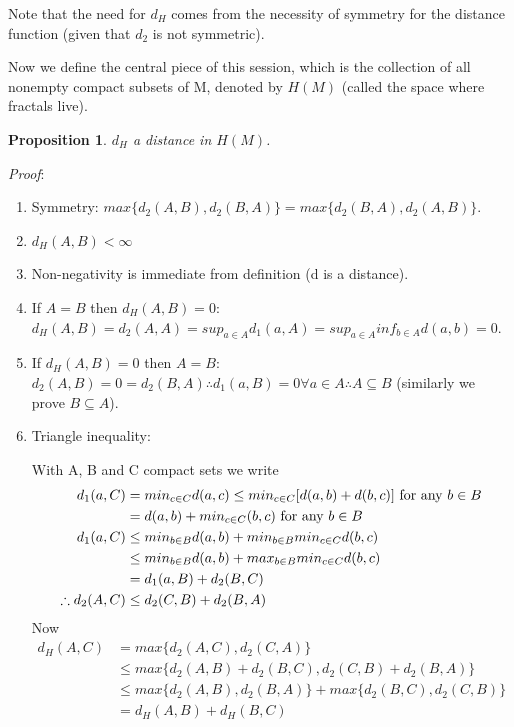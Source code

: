 \documentclass[a4paper]{article}
\theoremstyle{plain}
\newtheorem{prop} [theorem]{Proposition}
\theoremstyle{definition}
\begin{document}
Note that the need for $d_H$ comes from the necessity of symmetry for the distance function (given that $d_2$ is not symmetric).

Now we define the central piece of this session, which is the collection of all nonempty compact subsets of M, denoted by $H(M)$ (called the space where fractals live).

\begin{prop}
$d_H$ a distance in $H(M)$.
\end{prop}
\textit{Proof}: 
\begin{enumerate}
    \item Symmetry: $max\{d_2(A,B),d_2(B,A)\} = max\{d_2(B,A),d_2(A,B)\}$.
    \item $d_H(A,B) < \infty$
    \item Non-negativity is immediate from definition (d is a distance).
    \item If $A=B$ then $d_H(A,B) = 0$: $d_H(A,B) = d_2(A,A) = sup_{a \in A} d_1(a,A) = sup_{a \in A} inf_{b \in A} d(a,b) = 0$.
    \item If $d_H(A,B) = 0$ then $A=B$: $d_2(A,B) = 0 = d_2(B,A) \therefore d_1(a,B) = 0 \forall a \in A \therefore A \subseteq B$ (similarly we prove $B \subseteq A$).
    \item Triangle inequality:
    
    With A, B and C compact sets we write
    \begin{align*}
        d_1(a, C) &= min_{c \in C} d(a,c) \leq min_{c \in C}[d(a,b) + d(b,c)] \textnormal{ for any } b \in B\\
        &= d(a,b) + min_{c \in C}(b,c) \textnormal{ for any } b \in B\\
        d_1(a,C) &\leq min_{b\in B}d(a,b) + min_{b \in B} min_{c \in C} d(b,c)\\
        &\leq min_{b \in B}d(a,b) + max_{b \in B} min_{c \in C} d(b,c)\\
        &=d_1(a,B) + d_2(B,C) \\
        \therefore d_2(A,C) &\leq d_2(C,B) + d_2(B,A)
    \end{align*}
    Now
    \begin{align*}
        d_H(A,C) &= max\{d_2(A,C), d_2(C,A)\}\\
        &\leq max\{d_2(A,B) + d_2(B,C), d_2(C,B) + d_2(B,A)\}\\
        &\leq max\{d_2(A,B),d_2(B,A)\} + max\{d_2(B,C),d_2(C,B)\} \\
        &= d_H(A,B) + d_H(B,C)
    \end{align*}
    \qedsymbol
\end{enumerate}
\end{document}
